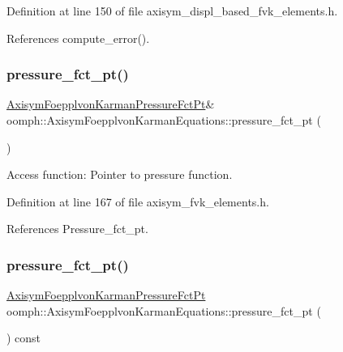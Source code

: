 Definition at line 150 of file axisym\+\_\+displ\+\_\+based\+\_\+fvk\+\_\+elements.\+h.



References compute\+\_\+error().

\mbox{\label{classoomph_1_1AxisymFoepplvonKarmanEquations_a65fd07792735f269b470f4e4cb3c06a2}} 
\subsubsection{\texorpdfstring{pressure\+\_\+fct\+\_\+pt()}{pressure\_fct\_pt()}\hspace{0.1cm}{\footnotesize\ttfamily [1/4]}}
{\footnotesize\ttfamily \hyperlink{classoomph_1_1AxisymFoepplvonKarmanEquations_a504878b18d793ef8a6540eb0f2b086c8}{Axisym\+Foepplvon\+Karman\+Pressure\+Fct\+Pt}\& oomph\+::\+Axisym\+Foepplvon\+Karman\+Equations\+::pressure\+\_\+fct\+\_\+pt (\begin{DoxyParamCaption}{ }\end{DoxyParamCaption})\hspace{0.3cm}{\ttfamily [inline]}}



Access function\+: Pointer to pressure function. 



Definition at line 167 of file axisym\+\_\+fvk\+\_\+elements.\+h.



References Pressure\+\_\+fct\+\_\+pt.

\mbox{\label{classoomph_1_1AxisymFoepplvonKarmanEquations_a02dd3dab84e6492d88fdd144a2eed64b}} 
\subsubsection{\texorpdfstring{pressure\+\_\+fct\+\_\+pt()}{pressure\_fct\_pt()}\hspace{0.1cm}{\footnotesize\ttfamily [2/4]}}
{\footnotesize\ttfamily \hyperlink{classoomph_1_1AxisymFoepplvonKarmanEquations_a504878b18d793ef8a6540eb0f2b086c8}{Axisym\+Foepplvon\+Karman\+Pressure\+Fct\+Pt} oomph\+::\+Axisym\+Foepplvon\+Karman\+Equations\+::pressure\+\_\+fct\+\_\+pt (\begin{DoxyParamCaption}{ }\end{DoxyParamCaption}) const\hspace{0.3cm}{\ttfamily [inline]}}



